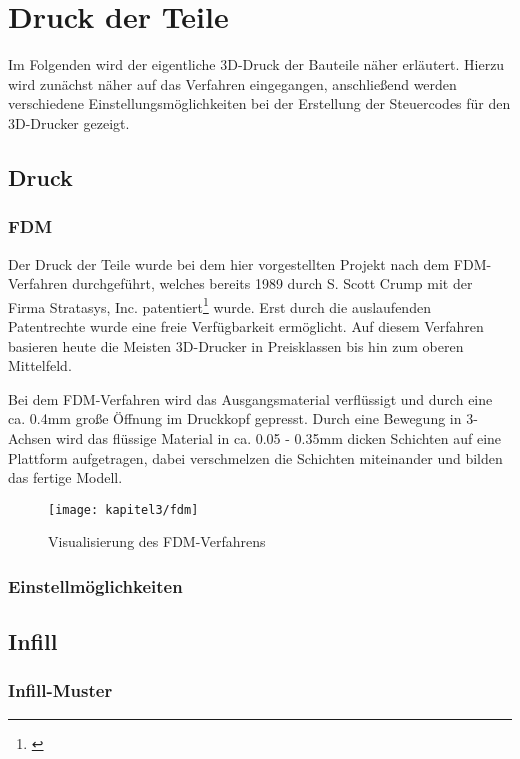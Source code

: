 \chapter{Druck der Teile}
Im Folgenden wird der eigentliche 3D-Druck der Bauteile näher erläutert. Hierzu wird zunächst näher auf das Verfahren eingegangen, anschließend werden verschiedene Einstellungsmöglichkeiten bei der Erstellung der Steuercodes für den 3D-Drucker gezeigt.

\section{Druck}

\subsection{FDM}
Der Druck der Teile wurde bei dem hier vorgestellten Projekt nach dem \ac{FDM}-Verfahren durchgeführt, welches bereits 1989 durch S. Scott Crump mit der Firma Stratasys, Inc. patentiert\footnote{\cite{Crump1992}} wurde. Erst durch die auslaufenden Patentrechte wurde eine freie Verfügbarkeit ermöglicht. Auf diesem Verfahren basieren heute die Meisten 3D-Drucker in Preisklassen bis hin zum oberen Mittelfeld.

Bei dem \ac{FDM}-Verfahren wird das Ausgangsmaterial verflüssigt und durch eine ca. 0.4mm große Öffnung im Druckkopf gepresst. Durch eine Bewegung in 3-Achsen wird das flüssige Material in ca. 0.05 - 0.35mm dicken Schichten auf eine Plattform aufgetragen, dabei verschmelzen die Schichten miteinander und bilden das fertige Modell.

\begin{figure}[h]
  \centering
  \texttt{[image: kapitel3/fdm]}
  \caption{Visualisierung des FDM-Verfahrens}
  \label{Kap3:FDM}
\end{figure}

\subsection{Einstellmöglichkeiten}

\TODO

\section{Infill}

\subsection{Infill-Muster}